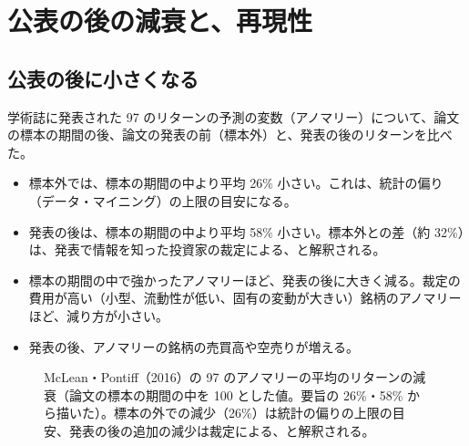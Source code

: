 \section{公表の後の減衰と、再現性}

\subsection{公表の後に小さくなる}

\begin{paperbox}
学術誌に発表された 97 のリターンの予測の変数（アノマリー）について、論文の標本の期間の後、論文の発表の前（標本外）と、発表の後のリターンを比べた。
\begin{itemize}
\item 標本外では、標本の期間の中より平均 26\% 小さい。これは、統計の偏り（データ・マイニング）の上限の目安になる。
\item 発表の後は、標本の期間の中より平均 58\% 小さい。標本外との差（約 32\%）は、発表で情報を知った投資家の裁定による、と解釈される。
\item 標本の期間の中で強かったアノマリーほど、発表の後に大きく減る。裁定の費用が高い（小型、流動性が低い、固有の変動が大きい）銘柄のアノマリーほど、減り方が小さい。
\item 発表の後、アノマリーの銘柄の売買高や空売りが増える。
\end{itemize}
\end{paperbox}

\begin{figure}[H]
\centering
{}
\caption{McLean・Pontiff（2016）の 97 のアノマリーの平均のリターンの減衰（論文の標本の期間の中を 100 とした値。要旨の 26\%・58\% から描いた）。標本の外での減少（26\%）は統計の偏りの上限の目安、発表の後の追加の減少は裁定による、と解釈される。}
\label{fig:mp}
\end{figure}

